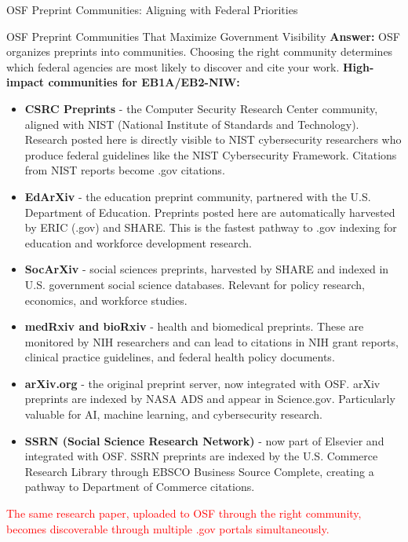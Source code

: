 \documentclass[11pt]{beamer}
\begin{document}
	\begin{frame}{OSF Preprint Communities: Aligning with Federal Priorities}
		\scriptsize
		\begin{block}{OSF Preprint Communities That Maximize Government Visibility}
			\textbf{Answer:} OSF organizes preprints into communities. Choosing the right community determines which federal agencies are most likely to discover and cite your work.
			\vspace{0.1cm}
			\textbf{High-impact communities for EB1A/EB2-NIW:}
			\begin{itemize}
				\item \textbf{CSRC Preprints} - the Computer Security Research Center community, aligned with NIST (National Institute of Standards and Technology). Research posted here is directly visible to NIST cybersecurity researchers who produce federal guidelines like the NIST Cybersecurity Framework. Citations from NIST reports become .gov citations.
				\item \textbf{EdArXiv} - the education preprint community, partnered with the U.S. Department of Education. Preprints posted here are automatically harvested by ERIC (.gov) and SHARE. This is the fastest pathway to .gov indexing for education and workforce development research.
				\item \textbf{SocArXiv} - social sciences preprints, harvested by SHARE and indexed in U.S. government social science databases. Relevant for policy research, economics, and workforce studies.
				\item \textbf{medRxiv and bioRxiv} - health and biomedical preprints. These are monitored by NIH researchers and can lead to citations in NIH grant reports, clinical practice guidelines, and federal health policy documents.
				\item \textbf{arXiv.org} - the original preprint server, now integrated with OSF. arXiv preprints are indexed by NASA ADS and appear in Science.gov. Particularly valuable for AI, machine learning, and cybersecurity research.
				\item \textbf{SSRN (Social Science Research Network)} - now part of Elsevier and integrated with OSF. SSRN preprints are indexed by the U.S. Commerce Research Library through EBSCO Business Source Complete, creating a pathway to Department of Commerce citations.
			\end{itemize}
			\textcolor{red}{The same research paper, uploaded to OSF through the right community, becomes discoverable through multiple .gov portals simultaneously.}
		\end{block}
	\end{frame}
	
\end{document}
